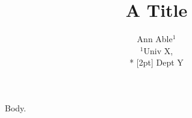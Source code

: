 \documentclass{article}
\begin{document}
\title{A Title}
\author{\begin{tabular}{c}Ann Able$^1$\\ $^1$Univ X,\\* [2pt] Dept Y\end{tabular}}
\maketitle
Body.
\end{document}
